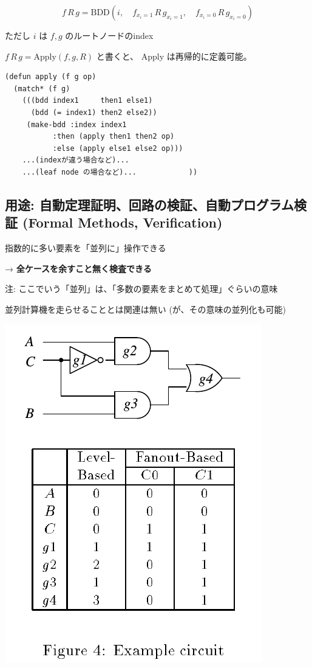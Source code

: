 \[
f\, R\, g = \text{BDD}(i,\quad f_{x_i=1}\, R\, g_{x_i=1},\quad f_{x_i=0}\, R\, g_{x_i=0})
\]

ただし $i$ は $f,g$ のルートノードのindex

$f\, R\, g = \text{Apply}(f,g,R)$ と書くと、 Apply は再帰的に定義可能。

\begin{verbatim}
(defun apply (f g op)
  (match* (f g)
    (((bdd index1     then1 else1)
      (bdd (= index1) then2 else2))
     (make-bdd :index index1
	       :then (apply then1 then2 op)
	       :else (apply else1 else2 op)))
    ...(indexが違う場合など)...
    ...(leaf node の場合など)...            ))
\end{verbatim}

\subsection{用途: 自動定理証明、回路の検証、自動プログラム検証 (Formal Methods, Verification)}
\label{sec-4-10}


\begin{container-fluid}
\begin{row-fluid}
\begin{span6}
指数的に多い要素を「並列に」操作できる

→ \textbf{全ケースを余すこと無く検査できる}

注: ここでいう「並列」は、「多数の要素をまとめて処理」ぐらいの意味

並列計算機を走らせることとは関連は無い (が、その意味の並列化も可能)
\end{span6}
\begin{span6}
\includegraphics{img/static/circuit.png}
\end{span6}
\end{row-fluid}
\end{container-fluid}

